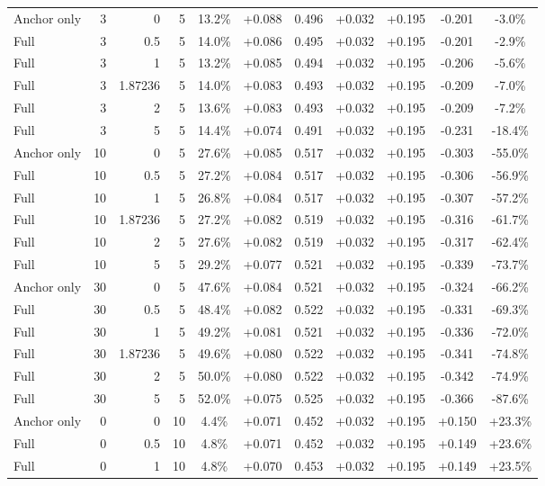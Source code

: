 \begin{table}[htbp]
\begin{tabular}{lrrrccccccc}
Anchor only & 3 & 0 & 5 & 13.2\% & +0.088 & 0.496 & +0.032 & +0.195 & -0.201 & -3.0\% \\
Full & 3 & 0.5 & 5 & 14.0\% & +0.086 & 0.495 & +0.032 & +0.195 & -0.201 & -2.9\% \\
Full & 3 & 1 & 5 & 13.2\% & +0.085 & 0.494 & +0.032 & +0.195 & -0.206 & -5.6\% \\
Full & 3 & 1.87236 & 5 & 14.0\% & +0.083 & 0.493 & +0.032 & +0.195 & -0.209 & -7.0\% \\
Full & 3 & 2 & 5 & 13.6\% & +0.083 & 0.493 & +0.032 & +0.195 & -0.209 & -7.2\% \\
Full & 3 & 5 & 5 & 14.4\% & +0.074 & 0.491 & +0.032 & +0.195 & -0.231 & -18.4\% \\
Anchor only & 10 & 0 & 5 & 27.6\% & +0.085 & 0.517 & +0.032 & +0.195 & -0.303 & -55.0\% \\
Full & 10 & 0.5 & 5 & 27.2\% & +0.084 & 0.517 & +0.032 & +0.195 & -0.306 & -56.9\% \\
Full & 10 & 1 & 5 & 26.8\% & +0.084 & 0.517 & +0.032 & +0.195 & -0.307 & -57.2\% \\
Full & 10 & 1.87236 & 5 & 27.2\% & +0.082 & 0.519 & +0.032 & +0.195 & -0.316 & -61.7\% \\
Full & 10 & 2 & 5 & 27.6\% & +0.082 & 0.519 & +0.032 & +0.195 & -0.317 & -62.4\% \\
Full & 10 & 5 & 5 & 29.2\% & +0.077 & 0.521 & +0.032 & +0.195 & -0.339 & -73.7\% \\
Anchor only & 30 & 0 & 5 & 47.6\% & +0.084 & 0.521 & +0.032 & +0.195 & -0.324 & -66.2\% \\
Full & 30 & 0.5 & 5 & 48.4\% & +0.082 & 0.522 & +0.032 & +0.195 & -0.331 & -69.3\% \\
Full & 30 & 1 & 5 & 49.2\% & +0.081 & 0.521 & +0.032 & +0.195 & -0.336 & -72.0\% \\
Full & 30 & 1.87236 & 5 & 49.6\% & +0.080 & 0.522 & +0.032 & +0.195 & -0.341 & -74.8\% \\
Full & 30 & 2 & 5 & 50.0\% & +0.080 & 0.522 & +0.032 & +0.195 & -0.342 & -74.9\% \\
Full & 30 & 5 & 5 & 52.0\% & +0.075 & 0.525 & +0.032 & +0.195 & -0.366 & -87.6\% \\
Anchor only & 0 & 0 & 10 & 4.4\% & +0.071 & 0.452 & +0.032 & +0.195 & +0.150 & +23.3\% \\
Full & 0 & 0.5 & 10 & 4.8\% & +0.071 & 0.452 & +0.032 & +0.195 & +0.149 & +23.6\% \\
Full & 0 & 1 & 10 & 4.8\% & +0.070 & 0.453 & +0.032 & +0.195 & +0.149 & +23.5\% \\

\end{tabular}
\end{table}
